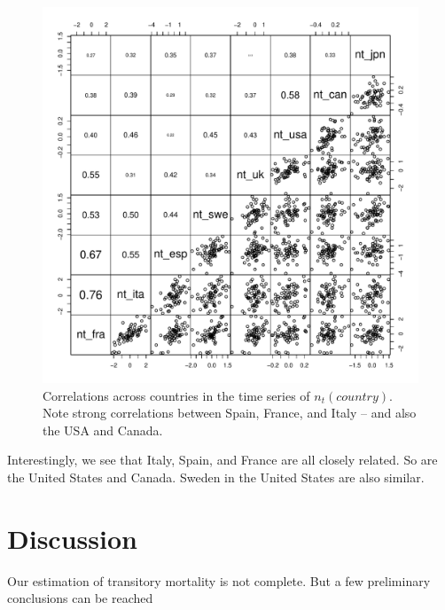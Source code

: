 \documentclass[12pt]{article}
\begin{document}
\begin{figure}
  \label{nt_pairs_fig}
  \includegraphics[width=1.05\textwidth]{./nt_pairs.pdf}
  \caption{Correlations across countries in the time series of
    $n_t(country)$. Note strong correlations between Spain, France,
    and Italy -- and also the USA and Canada.}
\end{figure}


Interestingly, we see that Italy, Spain, and France are all closely
related. So are the United States and Canada. Sweden in the United
States are also similar. 


\section{Discussion}

Our estimation of transitory mortality is not complete. But a few
preliminary conclusions can be reached
\end{document}
